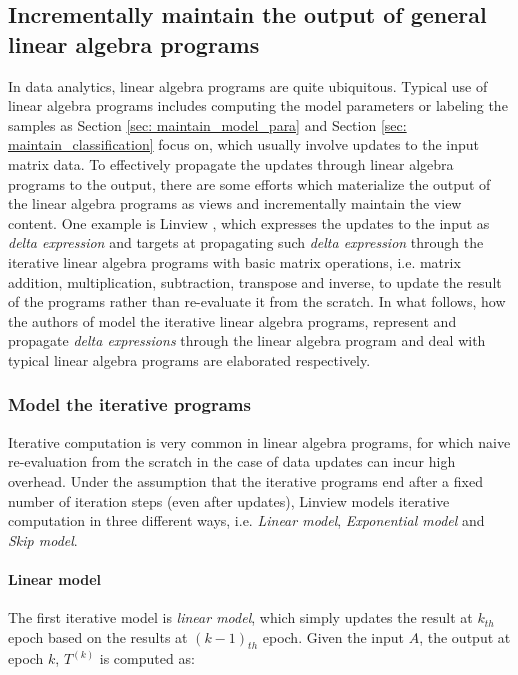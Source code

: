 \subsection{Incrementally maintain the output of general linear algebra programs}
In data analytics, linear algebra programs are quite ubiquitous. Typical use of linear algebra programs includes computing the model parameters or labeling the samples as Section \ref{sec: maintain_model_para} and Section \ref{sec: maintain_classification} focus on, which usually involve updates to the input matrix data. To effectively propagate the updates through linear algebra programs to the output, there are some efforts which materialize the output of the linear algebra programs as views and incrementally maintain the view content. One example is Linview \cite{nikolic2014linview}, which expresses the updates to the input as {\em delta expression} and targets at propagating such {\em delta expression} through the iterative linear algebra programs with basic matrix operations, i.e. matrix addition, multiplication, subtraction, transpose and inverse, to update the result of the programs rather than re-evaluate it from the scratch. In what follows, how the authors of \cite{nikolic2014linview} model the iterative linear algebra programs, represent and propagate {\em delta expressions} through the linear algebra program and deal with typical linear algebra programs are elaborated respectively.

\subsubsection{Model the iterative programs}\label{sec: iterative_model}
Iterative computation is very common in linear algebra programs, for which naive re-evaluation from the scratch in the case of data updates can incur high overhead. Under the assumption that the iterative programs end after a fixed number of iteration steps (even after updates), Linview models iterative computation in three different ways, i.e. {\em Linear model}, {\em Exponential model} and {\em Skip model}.

\paragraph{Linear model} The first iterative model is {\em linear model}, which simply updates the result at $k_{th}$ epoch based on the results at $(k-1)_{th}$ epoch. Given the input $A$, the output at epoch $k$, $T^{(k)}$ is computed as:

